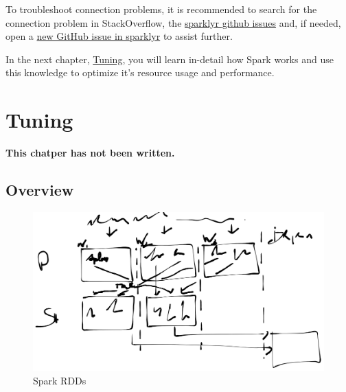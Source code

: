 \documentclass[]{book}
\theoremstyle{definition}
\theoremstyle{definition}
\theoremstyle{definition}
\theoremstyle{remark}
\begin{document}
To troubleshoot connection problems, it is recommended to search for the
connection problem in StackOverflow, the
\href{https://github.com/rstudio/sparklyr/issues}{sparklyr github
issues} and, if needed, open a
\href{https://github.com/rstudio/sparklyr/issues/new}{new GitHub issue
in sparklyr} to assist further.

In the next chapter, \protect\hyperlink{tuning}{Tuning}, you will learn
in-detail how Spark works and use this knowledge to optimize it's
resource usage and performance.

\hypertarget{tuning}{%
\chapter{Tuning}\label{tuning}}

\textbf{This chatper has not been written.}

\hypertarget{overview-3}{%
\section{Overview}\label{overview-3}}

\begin{figure}

{\centering \includegraphics[width=29.36in]{images/07-tuning-spark-rdds} 

}

\caption{Spark RDDs}\label{fig:unnamed-chunk-60}
\end{figure}
\end{document}
